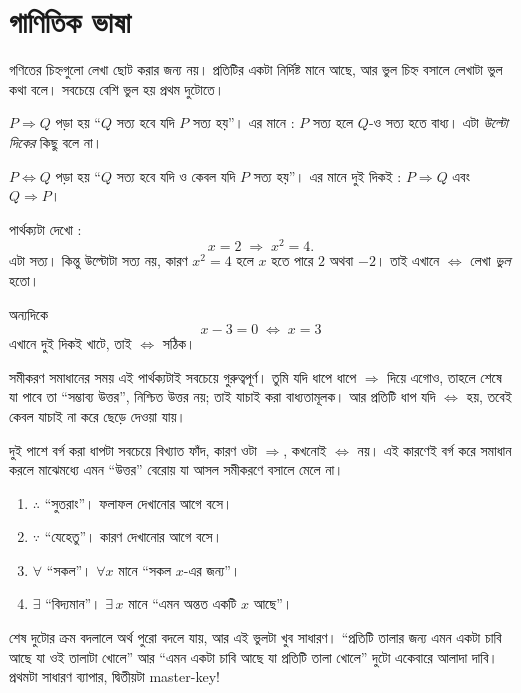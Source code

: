 \documentclass[11pt]{article}
\begin{document}
\section{গাণিতিক ভাষা}

\noindent
গণিতের চিহ্নগুলো লেখা ছোট করার জন্য নয়। প্রতিটির একটা নির্দিষ্ট মানে আছে, আর
ভুল চিহ্ন বসালে লেখাটা ভুল কথা বলে। সবচেয়ে বেশি ভুল হয় প্রথম দুটোতে।

\begin{idea}
$P \Rightarrow Q$ পড়া হয় ``$Q$ সত্য হবে যদি $P$  সত্য হয়''। এর মানে : $P$ সত্য হলে $Q$-ও সত্য
হতে বাধ্য। এটা \emph{উল্টো দিকের} কিছু বলে না।

$P \Leftrightarrow Q$ পড়া হয় ``$Q$ সত্য হবে যদি ও কেবল যদি $P$  সত্য হয়''। এর মানে দুই দিকই :
$P \Rightarrow Q$ এবং $Q \Rightarrow P$।

পার্থক্যটা দেখো :
\[
  x = 2 \;\Rightarrow\; x^2 = 4 .
\]
এটা সত্য। কিন্তু উল্টোটা সত্য নয়, কারণ $x^2 = 4$ হলে $x$ হতে পারে $2$ অথবা
$-2$। তাই এখানে $\Leftrightarrow$ লেখা \emph{ভুল} হতো।

অন্যদিকে
\[
  x - 3 = 0 \;\Leftrightarrow\; x = 3
\]
এখানে দুই দিকই খাটে, তাই $\Leftrightarrow$ সঠিক।
\end{idea}

\begin{remark}
সমীকরণ সমাধানের সময় এই পার্থক্যটাই সবচেয়ে গুরুত্বপূর্ণ। তুমি যদি ধাপে ধাপে
$\Rightarrow$ দিয়ে এগোও, তাহলে শেষে যা পাবে তা ``সম্ভাব্য উত্তর'', নিশ্চিত
উত্তর নয়; তাই যাচাই করা বাধ্যতামূলক। আর প্রতিটি ধাপ যদি $\Leftrightarrow$ হয়,
তবেই কেবল যাচাই না করে ছেড়ে দেওয়া যায়।

দুই পাশে বর্গ করা ধাপটা সবচেয়ে বিখ্যাত ফাঁদ, কারণ ওটা $\Rightarrow$, কখনোই
$\Leftrightarrow$ নয়। এই কারণেই বর্গ করে সমাধান করলে মাঝেমধ্যে এমন ``উত্তর''
বেরোয় যা আসল সমীকরণে বসালে মেলে না।
\end{remark}

\begin{idea}[বাকি চিহ্নগুলো]
\begin{enumerate}
  \item $\therefore$ \; ``সুতরাং''। ফলাফল দেখানোর আগে বসে।
  \item $\because$ \; ``যেহেতু''। কারণ দেখানোর আগে বসে।
  \item $\forall$ \; ``সকল''। $\forall x$ মানে ``সকল $x$-এর জন্য''।
  \item $\exists$ \; ``বিদ্যমান''। $\exists \, x$ মানে ``এমন অন্তত একটি $x$ আছে''।
\end{enumerate}

\noindent
শেষ দুটোর ক্রম বদলালে অর্থ পুরো বদলে যায়, আর এই ভুলটা খুব সাধারণ। ``প্রতিটি
তালার জন্য এমন একটা চাবি আছে যা ওই তালাটা খোলে'' আর ``এমন একটা চাবি আছে যা প্রতিটি
তালা খোলে'' দুটো একেবারে আলাদা দাবি। প্রথমটা সাধারণ ব্যাপার, দ্বিতীয়টা
master-key!
\end{idea}
\end{document}
